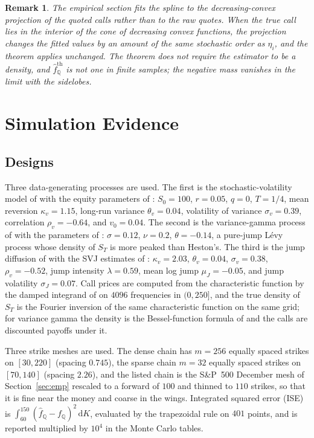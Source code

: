 \documentclass[preprint,12pt,authoryear,times]{elsarticle}
\newtheorem{remark}{Remark}
\newcommand{\Q}{\mathbb{Q}}
\newcommand{\fhat}{\hat f_{\Q}}
\begin{document}
\begin{remark}
The empirical section fits the spline to the decreasing-convex projection of the quoted calls rather than to the raw quotes. When the true call lies in the interior of the cone of decreasing convex functions, the projection changes the fitted values by an amount of the same stochastic order as \(\eta_i\), and the theorem applies unchanged. The theorem does not require the estimator to be a density, and \(\fhat^{\mathrm{th}}\) is not one in finite samples; the negative mass vanishes in the limit with the sidelobes.
\end{remark}

\section{Simulation Evidence}
\label{sec:sim}

\subsection{Designs}
\label{sec:designs}

Three data-generating processes are used. The first is the stochastic-volatility model of \citet{heston1993} with the equity parameters of \citet{bakshi1997}: \(S_0=100\), \(r=0.05\), \(q=0\), \(T=1/4\), mean reversion \(\kappa_v=1.15\), long-run variance \(\theta_v=0.04\), volatility of variance \(\sigma_v=0.39\), correlation \(\rho_v=-0.64\), and \(v_0=0.04\). The second is the variance-gamma process of \citet{madan1998} with the parameters of \citet{carrmadan1999}: \(\sigma=0.12\), \(\nu=0.2\), \(\theta=-0.14\), a pure-jump L\'evy process whose density of \(S_T\) is more peaked than Heston's. The third is the jump diffusion of \citet{bates1996} with the SVJ estimates of \citet{bakshi1997}: \(\kappa_v=2.03\), \(\theta_v=0.04\), \(\sigma_v=0.38\), \(\rho_v=-0.52\), jump intensity \(\lambda=0.59\), mean log jump \(\mu_J=-0.05\), and jump volatility \(\sigma_J=0.07\). Call prices are computed from the characteristic function by the damped integrand of \citet{carrmadan1999} on \(4096\) frequencies in \((0,250]\), and the true density of \(S_T\) is the Fourier inversion of the same characteristic function on the same grid; for variance gamma the density is the Bessel-function formula of \citet{madan1998} and the calls are discounted payoffs under it.

Three strike meshes are used. The dense chain has \(m=256\) equally spaced strikes on \([30,220]\) (spacing \(0.745\)), the sparse chain \(m=32\) equally spaced strikes on \([70,140]\) (spacing \(2.26\)), and the listed chain is the S\&P~500 December mesh of Section~\ref{sec:emp} rescaled to a forward of \(100\) and thinned to \(110\) strikes, so that it is fine near the money and coarse in the wings. Integrated squared error (ISE) is \(\int_{60}^{150}(\fhat-f_{\Q})^2\,\mathrm{d}K\), evaluated by the trapezoidal rule on \(401\) points, and is reported multiplied by \(10^4\) in the Monte Carlo tables.
\end{document}

